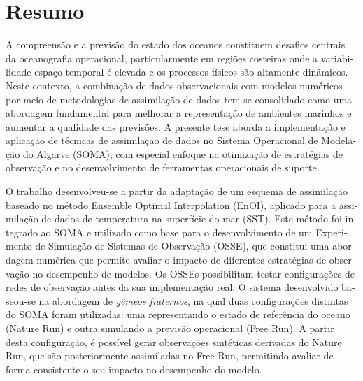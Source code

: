 \documentclass{auxfiles/ualgphdcls}
\begin{document}
\chapter*{Resumo}
\begin{otherlanguage}{portuguese}
A compreensão e a previsão do estado dos oceanos constituem desafios centrais da oceanografia operacional, particularmente em regiões costeiras onde a variabilidade espaço-temporal é elevada e os processos físicos são altamente dinâmicos. Neste contexto, a combinação de dados observacionais com modelos numéricos por meio de metodologias de assimilação de dados tem-se consolidado como uma abordagem fundamental para melhorar a representação de ambientes marinhos e aumentar a qualidade das previsões. A presente tese aborda a implementação e aplicação de técnicas de assimilação de dados no Sistema Operacional de Modelação do Algarve (SOMA), com especial enfoque na otimização de estratégias de observação e no desenvolvimento de ferramentas operacionais de suporte.

O trabalho desenvolveu-se a partir da adaptação de um esquema de assimilação baseado no método Ensemble Optimal Interpolation (EnOI), aplicado para a assimilação de dados de temperatura na superfície do mar (SST). Este método foi integrado ao SOMA e utilizado como base para o desenvolvimento de um Experimento de Simulação de Sistemas de Observação (OSSE), que constitui uma abordagem numérica que permite avaliar o impacto de diferentes estratégias de observação no desempenho de modelos. Os OSSEs possibilitam testar configurações de redes de observação antes da sua implementação real. O sistema desenvolvido baseou-se na abordagem de \emph{gêmeos fraternos}, na qual duas configurações distintas do SOMA foram utilizadas: uma representando o estado de referência do oceano (Nature Run) e outra simulando a previsão operacional (Free Run). A partir desta configuração, é possível gerar observações sintéticas derivadas do Nature Run, que são posteriormente assimiladas no Free Run, permitindo avaliar de forma consistente o seu impacto no desempenho do modelo.


\end{otherlanguage}
\end{document}
